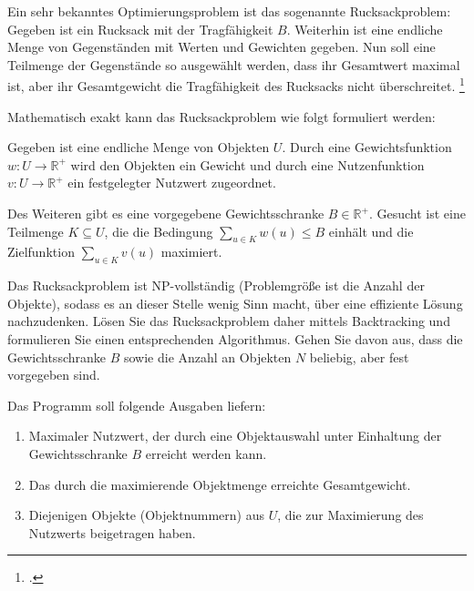 \documentclass{bschlangaul-aufgabe}
\begin{document}

Ein sehr bekanntes Optimierungsproblem ist das sogenannte
Rucksackproblem: Gegeben ist ein Rucksack mit der Tragfähigkeit $B$.
Weiterhin ist eine endliche Menge von Gegenständen mit Werten und
Gewichten gegeben. Nun soll eine Teilmenge der Gegenstände so ausgewählt
werden, dass ihr Gesamtwert maximal ist, aber ihr Gesamtgewicht die
Tragfähigkeit des Rucksacks nicht überschreitet.
\footcite[Seite 10]{examen:66115:2018:09}

Mathematisch exakt kann das Rucksackproblem wie folgt formuliert werden:

Gegeben ist eine endliche Menge von Objekten $U$. Durch eine
Gewichtsfunktion $w \colon U \rightarrow \mathbb{R}^+$ wird den Objekten
ein Gewicht und durch eine Nutzenfunktion $v \colon U \rightarrow
\mathbb{R}^+$ ein festgelegter Nutzwert zugeordnet.

Des Weiteren gibt es eine vorgegebene Gewichtsschranke $B \in
\mathbb{R}^+$. Gesucht ist eine Teilmenge $K \subseteq U$, die die
Bedingung $\sum_{u \in K} w(u) \leq B$ einhält und die Zielfunktion
$\sum_{u \in K} v(u)$ maximiert.

Das Rucksackproblem ist NP-vollständig (Problemgröße ist die Anzahl der
Objekte), sodass es an dieser Stelle wenig Sinn macht, über eine
effiziente Lösung nachzudenken. Lösen Sie das Rucksackproblem daher
mittels Backtracking und formulieren Sie einen entsprechenden
Algorithmus. Gehen Sie davon aus, dass die Gewichtsschranke $B$ sowie
die Anzahl an Objekten $N$ beliebig, aber fest vorgegeben sind.

\bigskip

\noindent
Das Programm soll folgende Ausgaben liefern:

\begin{enumerate}
\item Maximaler Nutzwert, der durch eine Objektauswahl unter Einhaltung
der Gewichtsschranke $B$ erreicht werden kann.

\item Das durch die maximierende Objektmenge erreichte Gesamtgewicht.

\item Diejenigen Objekte (Objektnummern) aus $U$, die zur Maximierung
des Nutzwerts beigetragen haben.

\end{enumerate}

\begin{bAntwort}
\end{bAntwort}
\end{document}

